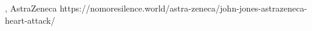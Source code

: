           {, }
          {}
          {AstraZeneca}
          {}
          {
          }
          {https://nomoresilence.world/astra-zeneca/john-jones-astrazeneca-heart-attack/}

